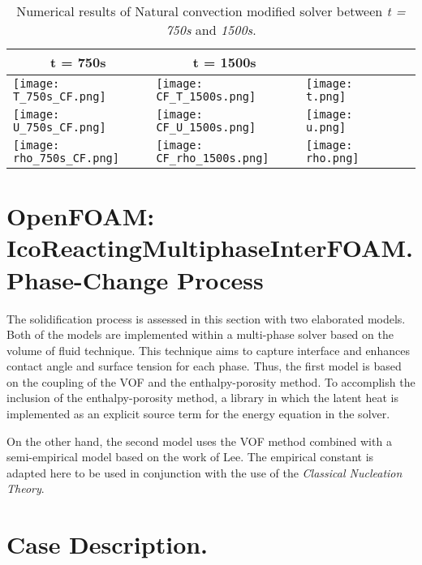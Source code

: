 \begin{table}[h!]
	\begin{tabular}{@{}lllll@{}}
		\toprule[1pt]
		\multicolumn{1}{c}{\textbf{t = 750s}} & \multicolumn{1}{c}{\textbf{t = 1500s}} \\ \midrule[2pt] 
		\texttt{[image: T\_750s\_CF.png]} & \texttt{[image: CF\_T\_1500s.png]} & \texttt{[image: t.png]} \\
		\texttt{[image: U\_750s\_CF.png]} &  \texttt{[image: CF\_U\_1500s.png]} & \texttt{[image: u.png]} \\
		\texttt{[image: rho\_750s\_CF.png]} &  \texttt{[image: CF\_rho\_1500s.png]} & \texttt{[image: rho.png]} \\ \bottomrule[1pt]		
	\end{tabular}
	\centering
	\caption{Numerical results of Natural convection modified solver between \textit{t = 750s} and \textit{1500s}.}	
	\label{3.7tab}
\end{table}

\clearpage
\section{OpenFOAM: IcoReactingMultiphaseInterFOAM. Phase-Change Process}
\setlength{\parindent}{0.5cm} The solidification process is assessed in this section with two elaborated models. Both of the models are implemented within a multi-phase solver based on the volume of fluid technique. This technique aims to capture interface and enhances contact angle and surface tension for each phase. Thus, the first model is based on the coupling of the VOF and the enthalpy-porosity method. To accomplish the inclusion of the enthalpy-porosity method, a library in which the latent heat is implemented as an explicit source term for the energy equation in the solver. 

\noindent On the other hand, the second model uses the VOF method combined with a semi-empirical model based on the work of Lee. The empirical constant is adapted here to be used in conjunction with the use of the \textit{Classical Nucleation Theory}.

\section{Case Description.}

